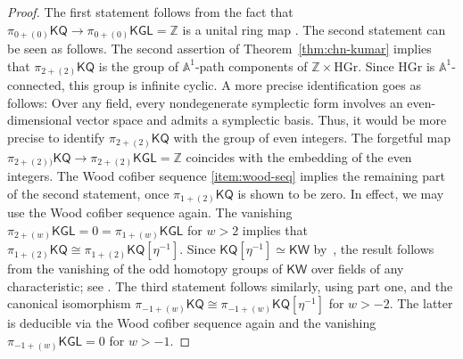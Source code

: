 \documentclass[11pt,hyp,english]{article}
\newcommand{\A}{\mathbb{A}}
\newcommand{\Z}{\mathbb{Z}}
\newcommand{\KGL}{\mathsf{KGL}}
\newcommand{\KQ}{\mathsf{KQ}}
\newcommand{\KW}{\mathsf{KW}}
\let\iso=\cong
\theoremstyle{definition}
\begin{document}
\begin{proof}
The first statement follows from the fact that $\pi_{0+(0)}\KQ\to \pi_{0+(0)}\KGL = \Z$ 
is a unital ring map \cite{chn}.
The second statement can be seen as follows. 
The second assertion of Theorem~\ref{thm:chn-kumar} implies that $\pi_{2+(2)}\KQ$ is the group of 
$\A^1$-path components of $\Z\times \mathrm{HGr}$. 
Since $\mathrm{HGr}$ is $\A^1$-connected, this group is infinite cyclic.
A more precise identification goes as follows: 
Over any field, 
every nondegenerate symplectic form involves an even-dimensional vector space 
and admits a symplectic basis.
Thus, it would be more precise to identify $\pi_{2+(2)}\KQ$ with the group of even integers.
The forgetful map $\pi_{2+(2))}\KQ \to \pi_{2+(2)}\KGL=\Z$ coincides with the embedding 
of the even integers.
The Wood cofiber sequence \eqref{item:wood-seq} implies the remaining part of the second statement, 
once $\pi_{1+(2)}\KQ$ is shown to be zero.
In effect, we may use the Wood cofiber sequence again.
The vanishing $\pi_{2+(w)}\KGL=0=\pi_{1+(w)}\KGL$ for $w>2$ implies that 
$\pi_{1+(2)}\KQ\iso \pi_{1+(2)}\KQ[\eta^{-1}]$.
Since $\KQ[\eta^{-1}]\simeq \KW$ by~, the result follows from the vanishing of the odd homotopy groups of $\KW$ over fields of any characteristic; see \cite[Proposition 5.3.7]{chn}.
The third statement follows similarly, using part one, 
and the canonical isomorphism $\pi_{-1+(w)}\KQ\iso \pi_{-1+(w)}\KQ[\eta^{-1}]$ for $w>-2$. 
The latter is deducible via the Wood cofiber sequence again and the vanishing $\pi_{-1+(w)}\KGL=0$ for $w>-1$.
\end{proof}
\end{document}

